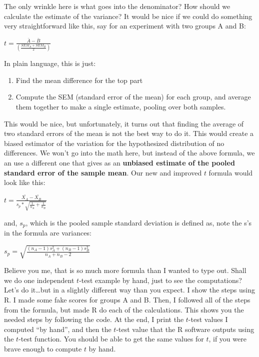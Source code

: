 \documentclass[]{book}
\providecommand{\tightlist}{%
  \setlength{\itemsep}{0pt}\setlength{\parskip}{0pt}}
\begin{document}
The only wrinkle here is what goes into the denominator? How should we calculate the estimate of the variance? It would be nice if we could do something very straightforward like this, say for an experiment with two groups A and B:

\(t = \frac{\bar{A}-\bar{B}}{(\frac{SEM_A+SEM_B}{2})}\)

In plain language, this is just:

\begin{enumerate}
\def\labelenumi{\arabic{enumi}.}
\tightlist
\item
  Find the mean difference for the top part
\item
  Compute the SEM (standard error of the mean) for each group, and average them together to make a single estimate, pooling over both samples.
\end{enumerate}

This would be nice, but unfortunately, it turns out that finding the average of two standard errors of the mean is not the best way to do it. This would create a biased estimator of the variation for the hypothesized distribution of no differences. We won't go into the math here, but instead of the above formula, we an use a different one that gives as an \textbf{unbiased estimate of the pooled standard error of the sample mean}. Our new and improved \(t\) formula would look like this:

\(t = \frac{\bar{X_A}-\bar{X_B}}{s_p * \sqrt{\frac{1}{n_A} + \frac{1}{n_B}}}\)

and, \(s_p\), which is the pooled sample standard deviation is defined as, note the s's in the formula are variances:

\(s_p = \sqrt{\frac{(n_A-1)s_A^2 + (n_B-1)s^2_B}{n_A +n_B -2}}\)

Believe you me, that is so much more formula than I wanted to type out. Shall we do one independent \(t\)-test example by hand, just to see the computations? Let's do it\ldots{}but in a slightly different way than you expect. I show the steps using R. I made some fake scores for groups A and B. Then, I followed all of the steps from the formula, but made R do each of the calculations. This shows you the needed steps by following the code. At the end, I print the \(t\)-test values I computed ``by hand'', and then the \(t\)-test value that the R software outputs using the \(t\)-test function. You should be able to get the same values for \(t\), if you were brave enough to compute \(t\) by hand.
\end{document}
